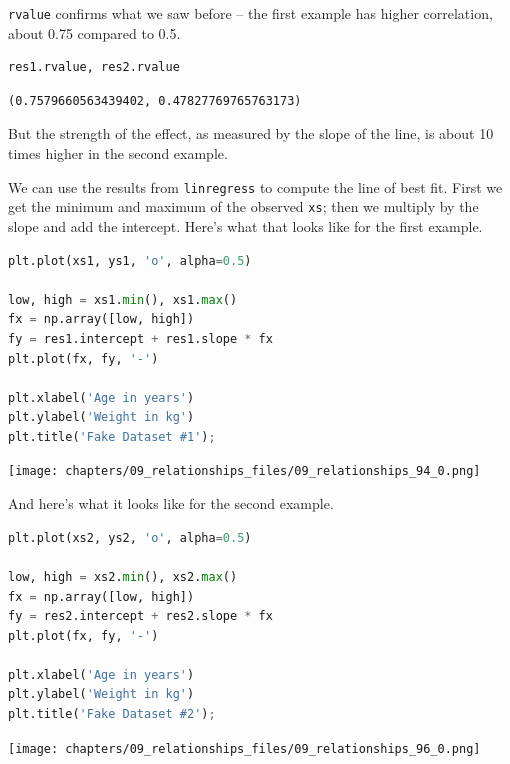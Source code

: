 \passthrough{\lstinline!rvalue!} confirms what we saw before -- the
first example has higher correlation, about 0.75 compared to 0.5.

\begin{lstlisting}[language=Python,style=source]
res1.rvalue, res2.rvalue
\end{lstlisting}

\begin{lstlisting}[style=output]
(0.7579660563439402, 0.47827769765763173)
\end{lstlisting}

But the strength of the effect, as measured by the slope of the line, is
about 10 times higher in the second example.

We can use the results from \passthrough{\lstinline!linregress!} to
compute the line of best fit. First we get the minimum and maximum of
the observed \passthrough{\lstinline!xs!}; then we multiply by the slope
and add the intercept. Here's what that looks like for the first
example.

\begin{lstlisting}[language=Python,style=source]
plt.plot(xs1, ys1, 'o', alpha=0.5)

low, high = xs1.min(), xs1.max()
fx = np.array([low, high])
fy = res1.intercept + res1.slope * fx
plt.plot(fx, fy, '-')

plt.xlabel('Age in years')
plt.ylabel('Weight in kg')
plt.title('Fake Dataset #1');
\end{lstlisting}

\begin{center}
\texttt{[image: chapters/09\_relationships\_files/09\_relationships\_94\_0.png]}
\end{center}

And here's what it looks like for the second example.

\begin{lstlisting}[language=Python,style=source]
plt.plot(xs2, ys2, 'o', alpha=0.5)

low, high = xs2.min(), xs2.max()
fx = np.array([low, high])
fy = res2.intercept + res2.slope * fx
plt.plot(fx, fy, '-')

plt.xlabel('Age in years')
plt.ylabel('Weight in kg')
plt.title('Fake Dataset #2');
\end{lstlisting}

\begin{center}
\texttt{[image: chapters/09\_relationships\_files/09\_relationships\_96\_0.png]}
\end{center}

